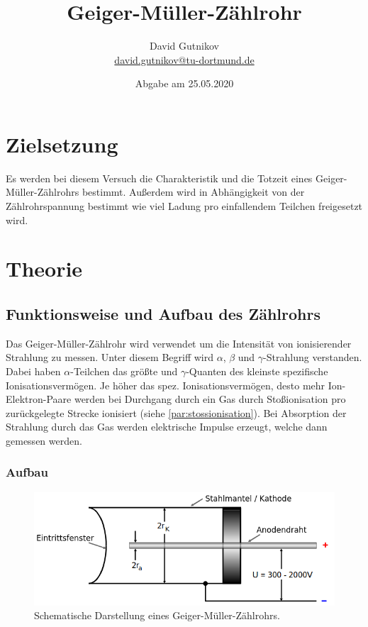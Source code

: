 \documentclass[titlepage = firstcover]{scrartcl}
\title{Geiger-Müller-Zählrohr}
\author{David Gutnikov \\
        \href{mailto:david.gutnikov@tu-dortmund.de}{david.gutnikov@tu-dortmund.de}}
\date{Abgabe am 25.05.2020}
\begin{document}
    \maketitle
    \newpage
    \tableofcontents
    \newpage

    \section{Zielsetzung}
      Es werden bei diesem Versuch die Charakteristik und die Totzeit eines Geiger-Müller-Zählrohrs bestimmt. Außerdem wird in Abhängigkeit von der Zählrohrspannung bestimmt wie viel Ladung pro einfallendem Teilchen freigesetzt wird.

    \section{Theorie}
      \subsection{Funktionsweise und Aufbau des Zählrohrs}
        Das Geiger-Müller-Zählrohr wird verwendet um die Intensität von ionisierender Strahlung zu messen. Unter diesem Begriff wird $\alpha$, $\beta$ und $\gamma$-Strahlung verstanden. Dabei haben $\alpha$-Teilchen das größte und $\gamma$-Quanten des kleinste spezifische Ionisationsvermögen. Je höher das spez. Ionisationsvermögen, desto mehr Ion-Elektron-Paare werden bei Durchgang durch ein Gas durch Stoßionisation pro zurückgelegte Strecke ionisiert (siehe \autoref{par:stossionisation}). Bei Absorption der Strahlung durch das Gas werden elektrische Impulse erzeugt, welche dann gemessen werden.
        \subsubsection{Aufbau}
          \begin{figure}[h]
            \centering
            \includegraphics[width = 0.8\linewidth]{geiger_mueller_aufbau.png}
            \caption{Schematische Darstellung eines Geiger-Müller-Zählrohrs.}
            \label{fig:geiger-mueller-zaehlrohr}
          \end{figure}
          \FloatBarrier
              
\end{document}
